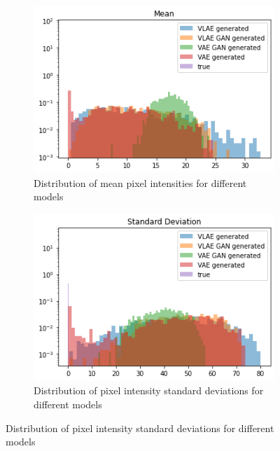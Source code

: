 \begin{figure}
    \centering
    \begin{subfigure}{0.48\textwidth}
        \centering
        \includegraphics[width=\textwidth]{images/generated_vs_true/dsprites/dsprites_vs_models_mean.png}
        \caption{Distribution of mean pixel intensities for different models}
        \label{subfig:mean_generated_vs_true_dsprites}
    \end{subfigure}
    \hfill
    \begin{subfigure}{0.48\textwidth}
        \centering
        \includegraphics[width=\textwidth]{images/generated_vs_true/dsprites/dsprites_vs_models_sd.png}
        \caption{Distribution of pixel intensity standard deviations for different models}
        \label{subfig:sd_generated_vs_true_dsprites}
    \end{subfigure}

\end{figure}
